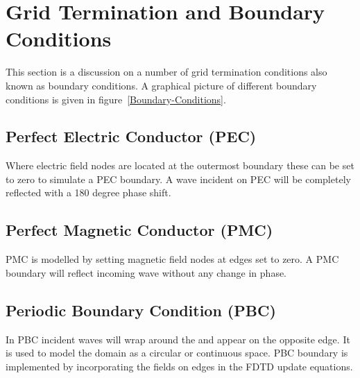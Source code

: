 \section{Grid Termination and Boundary Conditions}
This section is a discussion on a number of grid termination conditions also known as boundary conditions. A graphical picture of different boundary conditions is given in figure~\ref{Boundary-Conditions}.
\subsection{Perfect Electric Conductor (PEC)}
Where electric field nodes are located at the outermost boundary these can be set to zero to simulate a PEC boundary. A wave incident on PEC will be completely reflected with a 180 degree phase shift.
\subsection{Perfect Magnetic Conductor (PMC)}
PMC is modelled by setting magnetic field nodes at edges set to zero. A PMC boundary will reflect incoming wave without any change in phase.
\subsection{Periodic Boundary Condition (PBC)}
In PBC incident waves will wrap around the and appear on the opposite edge. It is used to model the domain as a circular or continuous space. PBC boundary is implemented by incorporating the fields on edges in the FDTD update equations.
